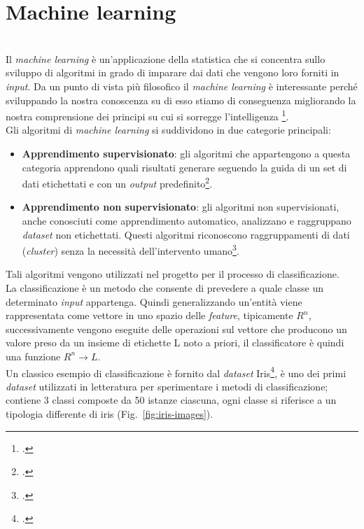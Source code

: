 \chapter{Machine learning}
\label{cap:teoria}
\\Il \emph{machine learning} è un'applicazione della statistica che si concentra sullo sviluppo di algoritmi in grado di imparare dai dati che vengono loro forniti in \emph{input}.
Da un punto di vista più filosofico il \emph{machine learning} è interessante perché sviluppando la nostra conoscenza su di esso stiamo di conseguenza migliorando la nostra comprensione dei principi su cui si sorregge l'intelligenza \footcite[p.~97]{Goodfellow-et-al-2016}.\\Gli algoritmi di \emph{machine learning} si suddividono in due categorie principali:

\begin{itemize}
    \item \textbf{Apprendimento supervisionato}: gli algoritmi che appartengono a questa categoria apprendono quali risultati generare seguendo la guida di un set di dati etichettati e con un \emph{output} predefinito\footcite{site:machine-learning}.

    \item \textbf{Apprendimento non supervisionato}: gli algoritmi non supervisionati, anche conosciuti come apprendimento automatico, analizzano e raggruppano \emph{dataset} non etichettati. Questi algoritmi riconoscono raggruppamenti di dati (\emph{cluster}) senza la necessità dell'intervento umano\footcite{site:machine-learning}.
\end{itemize}
Tali algoritmi vengono utilizzati nel progetto per il processo di classificazione.\\
La classificazione è un metodo che consente di prevedere a quale classe un determinato \emph{input} appartenga. 
Quindi generalizzando un'entità viene rappresentata come vettore in uno spazio delle \emph{feature}, tipicamente \( R^n \), successivamente vengono eseguite delle operazioni sul vettore che producono un valore preso da un insieme di etichette L noto a priori, il classificatore è quindi una funzione \( R^n \rightarrow L \).\\Un classico esempio di classificazione è fornito dal \emph{dataset} Iris\footcite{site:iris-dataset}, è uno dei primi \emph{dataset} utilizzati in letteratura per sperimentare i metodi di classificazione; contiene 3 classi composte da 50 istanze ciascuna, ogni classe si riferisce a un tipologia differente di iris (Fig.~\ref{fig:iris-images}).

